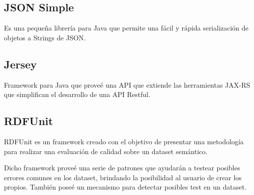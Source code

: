 \subsection{JSON Simple}

Es una pequeña librería para Java que permite una fácil y rápida serialización de objetos a 
Strings de JSON.

\subsection{Jersey}

Framework para Java que proveé una API que extiende las herramientas JAX-RS que simplifican el 
desarrollo de una API Restful. 

\subsection{RDFUnit}

RDFUnit \cite{Kontokostas2014} es un framework creado con el objetivo de presentar una metodología para realizar una evaluación 
de calidad sobre un dataset semántico.

Dicho framework proveé una serie de patrones que ayudarán a testear posibles errores comunes en los dataset, brindando la posibilidad 
al usuario de crear los propios. También poseé un mecanismo para detectar posibles test en un dataset.